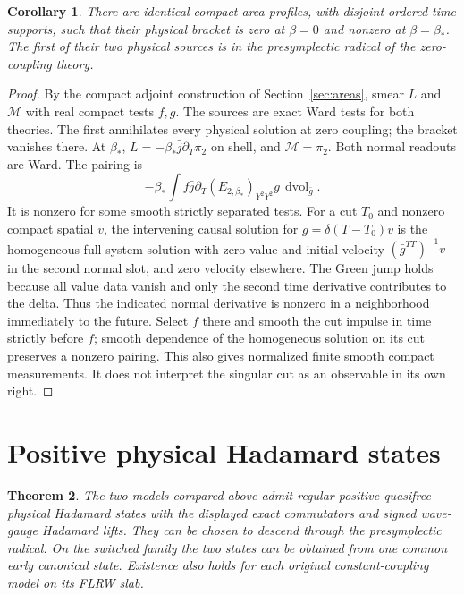 \documentclass[11pt]{article}
\newtheorem{theorem}{Theorem}[section]
\newtheorem{corollary}[theorem]{Corollary}
\newcommand{\vol}{\operatorname{dvol}}
\begin{document}
\begin{corollary}\label{cor:zero}
There are identical compact area profiles, with disjoint ordered time supports, such that their physical bracket is zero at $\beta=0$ and nonzero at $\beta=\beta_*$. The first of their two physical sources is in the presymplectic radical of the zero-coupling theory.
\end{corollary}

\begin{proof}
By the compact adjoint construction of Section~\ref{sec:areas}, smear $L$ and $\mathcal M$ with real compact tests $f,g$. The sources are exact Ward tests for both theories. The first annihilates every physical solution at zero coupling; the bracket vanishes there. At $\beta_*$, $L=-\beta_*\bar j\partial_T\pi_2$ on shell, and $\mathcal M=\pi_2$. Both normal readouts are Ward. The pairing is
\[
 -\beta_*\int f\bar j\partial_T (E_{2,\beta_*})_{Y^2Y^2}g\,\vol_{\bar g}.
\]
It is nonzero for some smooth strictly separated tests. For a cut $T_0$ and nonzero compact spatial $v$, the intervening causal solution for $g=\delta(T-T_0)v$ is the homogeneous full-system solution with zero value and initial velocity $(\bar g^{TT})^{-1}v$ in the second normal slot, and zero velocity elsewhere. The Green jump holds because all value data vanish and only the second time derivative contributes to the delta. Thus the indicated normal derivative is nonzero in a neighborhood immediately to the future. Select $f$ there and smooth the cut impulse in time strictly before $f$; smooth dependence of the homogeneous solution on its cut preserves a nonzero pairing. This also gives normalized finite smooth compact measurements. It does not interpret the singular cut as an observable in its own right.
\end{proof}

\section{Positive physical Hadamard states}\label{sec:states}

\begin{theorem}\label{thm:states}
The two models compared above admit regular positive quasifree physical Hadamard states with the displayed exact commutators and signed wave-gauge Hadamard lifts. They can be chosen to descend through the presymplectic radical. On the switched family the two states can be obtained from one common early canonical state. Existence also holds for each original constant-coupling model on its FLRW slab.
\end{theorem}
\end{document}
